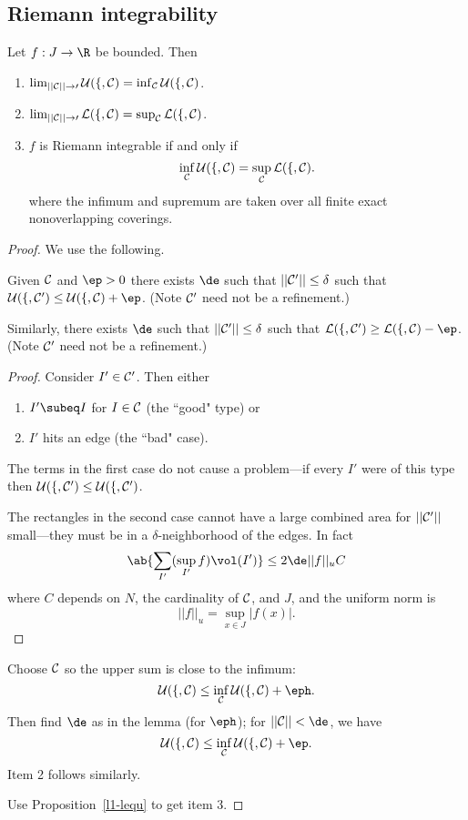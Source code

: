 
\subsection{Riemann integrability}

\begin{thm}
Let $f:J\to \R$ be bounded.
Then
\begin{enumerate}
\item $\lim_{||\cal C||\to 0} \cal U(f, \cal C)=\inf_{\cal C} \cal U(f,\cal C)$.
\item $\lim_{||\cal C||\to 0} \cal L(f, \cal C)=\sup_{\cal C} \cal L(f,\cal C)$.
\item 
 $f$ is Riemann integrable if and only if
\[
\inf_{\cal C} \cal U(f, \cal C)=\sup_{\cal C} \cal L(f, \cal C).
\]
where the infimum and supremum are taken over all finite exact nonoverlapping coverings.
\end{enumerate}
\end{thm}
\begin{proof}
We use the following.
\begin{lem}
Given $\cal C$ and $\ep>0$ there exists $\de$ such that $||\cal C'||\leq \delta$ such that $\cal U(f, \cal C')\leq U(f, \cal C)+\ep$. (Note $\cal C'$ need not be a refinement.)

Similarly, there exists $\de$ such that $||\cal C'||\leq \delta$ such that $\cal L(f, \cal C')\geq L(f, \cal C)-\ep$. (Note $\cal C'$ need not be a refinement.)
\end{lem}
\begin{proof}
Consider $I'\in \cal C'$. Then either
\begin{enumerate}
\item
$I'\subeq I$ for $I\in \cal C$ (the ``good" type) or
\item 
$I'$ hits an edge (the ``bad" case).
\end{enumerate}
The terms in the first case do not cause a problem---if every $I'$ were of this type then $\cal U(f, \cal C')\leq \cal U(f, \cal C')$.

The rectangles in the second case cannot have a large combined area for $||\cal C'||$ small---they must be in a $\delta$-neighborhood of the edges. In fact
\[
\ab{\sum_{I'} (\sup_{I'} f)\vol(I')}\leq 2\de ||f||_uC
\]
where $C$ depends on $N$, the cardinality of $\cal C$, and $J$, and the uniform norm is
\[
||f||_u=\sup_{x\in J} |f(x)|.
\]
\end{proof}
Choose $\cal C$ so the upper sum is close to the infimum:
\[
\cal U(f,\cal C)\leq \inf_{\cal C} \cal U(f,\cal C)+\eph.
\]
Then find $\de$ as in the lemma (for $\eph$); for $||\cal C||<\de$, we have \[\cal U(f,\cal C)\leq \inf_{\cal C}\cal U(f, \cal C)+\ep.\]
Item 2 follows similarly. 

Use Proposition~\ref{l1-lequ} to get item 3.
\end{proof}
